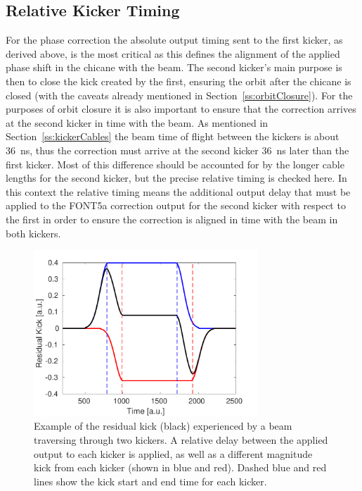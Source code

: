 \subsection{Relative Kicker Timing}
\label{ss:relativeTiming}

For the phase correction the absolute output timing sent to the first kicker, as derived above, is the most critical as this defines the alignment of the applied phase shift in the chicane with the beam. The second kicker's main purpose is then to close the kick created by the first, ensuring the orbit after the chicane is closed (with the caveats already mentioned in Section~\ref{ss:orbitClosure}). For the purposes of orbit closure it is also important to ensure that the correction arrives at the second kicker in time with the beam. As mentioned in Section~\ref{ss:kickerCables} the beam time of flight between the kickers is about 36~ns, thus the correction must arrive at the second kicker 36~ns later than the first kicker. Most of this difference should be accounted for by the longer cable lengths for the second kicker, but the precise relative timing is checked here. In this context the relative timing means the additional output delay that must be applied to the FONT5a correction output for the second kicker with respect to the first in order to ensure the correction is aligned in time with the beam in both kickers.


\begin{figure}
  \centering
  \includegraphics[width=0.75\textwidth]{Figures/commissioning/relDelay_sim}
  \caption{Example of the residual kick (black) experienced by a beam traversing through two kickers. A relative delay between the applied output to each kicker is applied, as well as a different magnitude kick from each kicker (shown in blue and red). Dashed blue and red lines show the kick start and end time for each kicker.}
  \label{f:relDelay_sim}
\end{figure}


